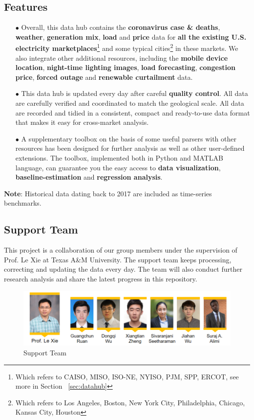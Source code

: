 \documentclass[11pt]{article}
\numberwithin{equation}{section}
\numberwithin{table}{section}
\numberwithin{figure}{section}
\begin{document}
\subsection{Features}
\begin{itemize}
    \item[$\bullet$] Overall, this data hub contains the \textbf{coronavirus case \& deaths}, \textbf{weather}, \textbf{generation mix}, \textbf{load} and \textbf{price} data for \textbf{all the existing U.S. electricity marketplaces}\footnote{Which refers to CAISO, MISO, ISO-NE, NYISO, PJM, SPP, ERCOT, see more in Section ~\ref{sec:datahub}} and some typical cities\footnote{Which refers to Los Angeles, Boston, New York City, Philadelphia, Chicago, Kansas City, Houston} in these markets. We also integrate other additional resources, including the \textbf{mobile device location}, \textbf{night-time lighting images}, \textbf{load forecasting}, \textbf{congestion price}, \textbf{forced outage} and \textbf{renewable curtailment} data. 
    \item[$\bullet$] This data hub is updated every day after careful \textbf{quality control}. All data are carefully verified and coordinated to match the geological scale. All data are recorded and tidied in a consistent, compact and ready-to-use data format that makes it easy for cross-market analysis.
    \item[$\bullet$] A supplementary toolbox on the basis of some useful parsers with other resources has been designed for further analysis as well as other user-defined extensions. The toolbox, implemented both in Python and MATLAB language, can guarantee you the easy access to \textbf{data visualization}, \textbf{baseline-estimation} and \textbf{regression analysis}.
\end{itemize}

\textbf{Note}: Historical data dating back to 2017 are included as time-series benchmarks.

\subsection{Support Team}
This project is a collaboration of our group members under the supervision of Prof. Le Xie at Texas A\&M University. The support team keeps processing, correcting and updating the data every day. The team will also conduct further research analysis and share the latest progress in this repository.

\begin{figure}[!ht]
    \centering
    \includegraphics[width=.7\textwidth]{figures/contributor-0725.png}
    \caption{Support Team}
\end{figure}
\end{document}
